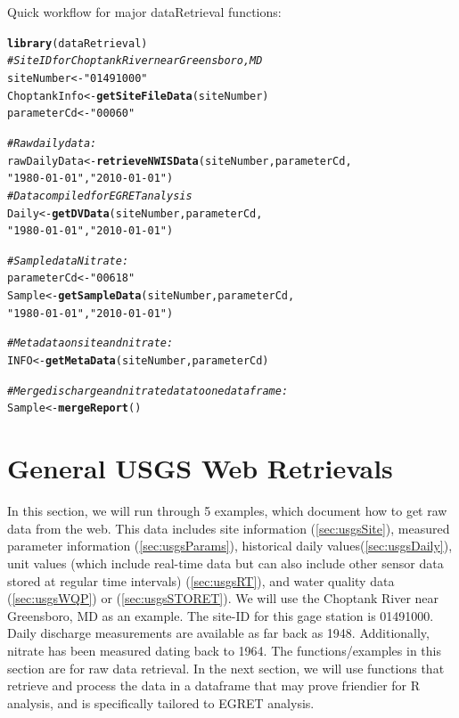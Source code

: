 \documentclass[a4paper,11pt]{article}\usepackage[]{graphicx}\usepackage[]{color}
\makeatletter
\newcommand{\hlstr}[1]{\textcolor[rgb]{0.192,0.494,0.8}{#1}}%
\newcommand{\hlcom}[1]{\textcolor[rgb]{0.678,0.584,0.686}{\textit{#1}}}%
\newcommand{\hlstd}[1]{\textcolor[rgb]{0.345,0.345,0.345}{#1}}%
\newcommand{\hlkwb}[1]{\textcolor[rgb]{0.69,0.353,0.396}{#1}}%
\newcommand{\hlkwd}[1]{\textcolor[rgb]{0.737,0.353,0.396}{\textbf{#1}}}%
\newenvironment{kframe}{%
 \def\at@end@of@kframe{}%
 \ifinner\ifhmode%
  \def\at@end@of@kframe{\end{minipage}}%
  \begin{minipage}{\columnwidth}%
 \fi\fi%
 \def\FrameCommand##1{\hskip\@totalleftmargin \hskip-\fboxsep
 \colorbox{shadecolor}{##1}\hskip-\fboxsep
     \hskip-\linewidth \hskip-\@totalleftmargin \hskip\columnwidth}%
 \MakeFramed {\advance\hsize-\width
   \@totalleftmargin\z@ \linewidth\hsize
   \@setminipage}}%
 {\par\unskip\endMakeFramed%
 \at@end@of@kframe}
\newenvironment{knitrout}{}{} %
\makeatother
\begin{document}
Quick workflow for major dataRetrieval functions:
\begin{knitrout}
\color{fgcolor}\begin{kframe}
\begin{alltt}
\hlkwd{library}\hlstd{(dataRetrieval)}
\hlcom{# Site ID for Choptank River near Greensboro, MD}
\hlstd{siteNumber} \hlkwb{<-} \hlstr{"01491000"}
\hlstd{ChoptankInfo} \hlkwb{<-} \hlkwd{getSiteFileData}\hlstd{(siteNumber)}
\hlstd{parameterCd} \hlkwb{<-} \hlstr{"00060"}

\hlcom{#Raw daily data:}
\hlstd{rawDailyData} \hlkwb{<-} \hlkwd{retrieveNWISData}\hlstd{(siteNumber,parameterCd,}
                      \hlstr{"1980-01-01"}\hlstd{,}\hlstr{"2010-01-01"}\hlstd{)}
\hlcom{# Data compiled for EGRET analysis}
\hlstd{Daily} \hlkwb{<-} \hlkwd{getDVData}\hlstd{(siteNumber,parameterCd,}
                      \hlstr{"1980-01-01"}\hlstd{,}\hlstr{"2010-01-01"}\hlstd{)}

\hlcom{# Sample data Nitrate:}
\hlstd{parameterCd} \hlkwb{<-} \hlstr{"00618"}
\hlstd{Sample} \hlkwb{<-} \hlkwd{getSampleData}\hlstd{(siteNumber,parameterCd,}
                      \hlstr{"1980-01-01"}\hlstd{,}\hlstr{"2010-01-01"}\hlstd{)}

\hlcom{# Metadata on site and nitrate:}
\hlstd{INFO} \hlkwb{<-} \hlkwd{getMetaData}\hlstd{(siteNumber,parameterCd)}

\hlcom{# Merge discharge and nitrate data to one dataframe:}
\hlstd{Sample} \hlkwb{<-} \hlkwd{mergeReport}\hlstd{()}
\end{alltt}
\end{kframe}
\end{knitrout}



\section{General USGS Web Retrievals}
\label{sec:genRetrievals}
In this section, we will run through 5 examples, which document how to get raw data from the web. This data includes site information (\ref{sec:usgsSite}), measured parameter information (\ref{sec:usgsParams}), historical daily values(\ref{sec:usgsDaily}), unit values (which include real-time data but can also include other sensor data stored at regular time intervals) (\ref{sec:usgsRT}), and water quality data (\ref{sec:usgsWQP}) or (\ref{sec:usgsSTORET}). We will use the Choptank River near Greensboro, MD as an example.  The site-ID for this gage station is 01491000. Daily discharge measurements are available as far back as 1948.  Additionally, nitrate has been measured dating back to 1964. The functions/examples in this section are for raw data retrieval.  In the next section, we will use functions that retrieve and process the data in a dataframe that may prove friendier for R analysis, and is specifically tailored to EGRET analysis.
\end{document}
